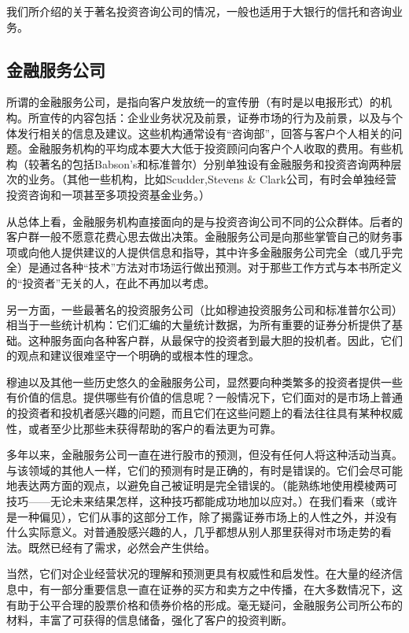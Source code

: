 \documentclass[12pt,oneside]{book}
\begin{document}
我们所介绍的关于著名投资咨询公司的情况，一般也适用于大银行的信托和咨询业务。

\subsection{金融服务公司}
所谓的金融服务公司，是指向客户发放统一的宣传册（有时是以电报形式）的机构。所宣传的内容包括：企业业务状况及前景，证券市场的行为及前景，以及与个体发行相关的信息及建议。这些机构通常设有“咨询部”，回答与客户个人相关的问题。金融服务机构的平均成本要大大低于投资顾问向客户个人收取的费用。有些机构（较著名的包括Babson's和标准普尔）分别单独设有金融服务和投资咨询两种层次的业务。（其他一些机构，比如Scudder,Stevens \& Clark公司，有时会单独经营投资咨询和一项甚至多项投资基金业务。）

从总体上看，金融服务机构直接面向的是与投资咨询公司不同的公众群体。后者的客户群一般不愿意花费心思去做出决策。金融服务公司是向那些掌管自己的财务事项或向他人提供建议的人提供信息和指导，其中许多金融服务公司完全（或几乎完全）是通过各种“技术”方法对市场运行做出预测。对于那些工作方式与本书所定义的“投资者”无关的人，在此不再加以考虑。

另一方面，一些最著名的投资服务公司（比如穆迪投资服务公司和标准普尔公司）相当于一些统计机构：它们汇编的大量统计数据，为所有重要的证券分析提供了基础。这种服务面向各种客户群，从最保守的投资者到最大胆的投机者。因此，它们的观点和建议很难坚守一个明确的或根本性的理念。

穆迪以及其他一些历史悠久的金融服务公司，显然要向种类繁多的投资者提供一些有价值的信息。提供哪些有价值的信息呢？一般情况下，它们面对的是市场上普通的投资者和投机者感兴趣的问题，而且它们在这些问题上的看法往往具有某种权威性，或者至少比那些未获得帮助的客户的看法更为可靠。

多年以来，金融服务公司一直在进行股市的预测，但没有任何人将这种活动当真。与该领域的其他人一样，它们的预测有时是正确的，有时是错误的。它们会尽可能地表达两方面的观点，以避免自己被证明是完全错误的。（能熟练地使用模棱两可技巧——无论未来结果怎样，这种技巧都能成功地加以应对。）在我们看来（或许是一种偏见），它们从事的这部分工作，除了揭露证券市场上的人性之外，并没有什么实际意义。对普通股感兴趣的人，几乎都想从别人那里获得对市场走势的看法。既然已经有了需求，必然会产生供给。

当然，它们对企业经营状况的理解和预测更具有权威性和启发性。在大量的经济信息中，有一部分重要信息一直在证券的买方和卖方之中传播，在大多数情况下，这有助于公平合理的股票价格和债券价格的形成。毫无疑问，金融服务公司所公布的材料，丰富了可获得的信息储备，强化了客户的投资判断。
\end{document}
